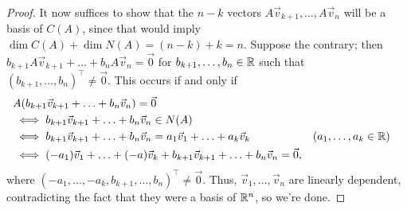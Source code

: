 \documentclass[main.tex]{subfiles}
\begin{document}
\begin{proof}
    It now suffices to show that the $n - k$ vectors $A\vec{v}_{k + 1}, \ldots , A\vec{v}_n$ will be a basis of $C(A)$, since that would imply $\dim C(A) + \dim N(A) = (n - k) + k = n$. Suppose the contrary; then $b_{k + 1}A\vec{v}_{k + 1} + \ldots + b_nA\vec{v}_n = \vec{0}$ for $b_{k + 1}, \ldots , b_n \in \mathbb R$ such that $(b_{k + 1}, \ldots , b_n)^\top \neq \vec{0}$. This occurs if and only if
    \begin{align*}
        &A(b_{k + 1}\vec{v}_{k + 1} + \ldots + b_n\vec{v}_n) = \vec{0} \\
        &\iff b_{k + 1}\vec{v}_{k + 1} + \ldots + b_n\vec{v}_n\in N(A) \\
        &\iff b_{k + 1}\vec{v}_{k + 1} + \ldots + b_n\vec{v}_n = a_1\vec{v}_1 + \ldots + a_k\vec{v}_k && (a_1, \ldots , a_k\in \mathbb R) \\
        &\iff (-a_1)\vec{v}_1 + \ldots + (-a)\vec{v}_k + b_{k + 1}\vec{v}_{k + 1} + \ldots + b_n\vec{v}_n = \vec{0},
    \end{align*}
    where $(-a_1, \ldots , -a_k, b_{k + 1}, \ldots , b_n)^\top \neq \vec{0}$. Thus, $\vec{v}_1, \ldots , \vec{v}_n$ are linearly dependent, contradicting the fact that they were a basis of $\mathbb R^n$, so we're done.
\end{proof}
\end{document}
